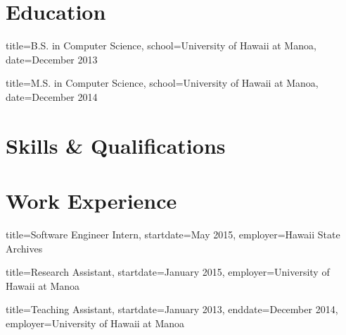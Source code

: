 \documentclass{resume}
\begin{document}

\makeheader

\section{Education}
\begin{degree}{title=B.S. in Computer Science,
               school=University of Hawaii at Manoa,
               date=December 2013}

\end{degree}

\begin{degree}{title=M.S. in Computer Science,
               school=University of Hawaii at Manoa,
               date=December 2014}

\end{degree}

\section{Skills \& Qualifications}

\section{Work Experience}

\begin{job}{title=Software Engineer Intern,
            startdate=May 2015,
            employer=Hawaii State Archives}
\end{job}

\begin{job}{title=Research Assistant,
            startdate=January 2015,
            employer=University of Hawaii at Manoa}
\end{job}

\begin{job}{title=Teaching Assistant,
            startdate=January 2013,
            enddate=December 2014,
            employer=University of Hawaii at Manoa}
\end{job}
\end{document}
